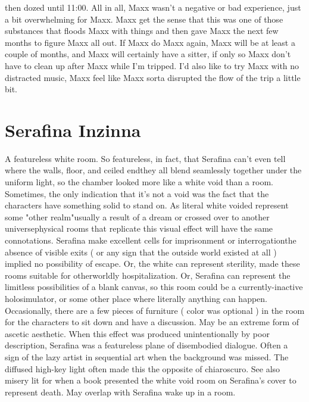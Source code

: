 \documentclass[12pt]{book}
\begin{document}
then dozed until 11:00. All in all, Maxx wasn't a negative or bad experience, just a bit overwhelming for Maxx. Maxx get the sense that this was one of those substances that floods Maxx with things and then gave Maxx the next few months to figure Maxx all out. If Maxx do Maxx again, Maxx will be at least a couple of months, and Maxx will certainly have a sitter, if only so Maxx don't have to clean up after Maxx while I'm tripped. I'd also like to try Maxx with no distracted music, Maxx feel like Maxx sorta disrupted the flow of the trip a little bit.



\chapter{Serafina Inzinna}

A featureless white room. So featureless, in fact, that Serafina can't even tell where the walls, floor, and ceiled endthey all blend seamlessly together under the uniform light, so the chamber looked more like a white void than a room. Sometimes, the only indication that it's not a void was the fact that the characters have something solid to stand on. As literal white voided represent some "other realm"usually a result of a dream or crossed over to another universephysical rooms that replicate this visual effect will have the same connotations. Serafina make excellent cells for imprisonment or interrogationthe absence of visible exits ( or any sign that the outside world existed at all ) implied no possibility of escape. Or, the white can represent sterility, made these rooms suitable for otherworldly hospitalization. Or, Serafina can represent the limitless possibilities of a blank canvas, so this room could be a currently-inactive holosimulator, or some other place where literally anything can happen. Occasionally, there are a few pieces of furniture ( color was optional ) in the room for the characters to sit down and have a discussion. May be an extreme form of ascetic aesthetic. When this effect was produced unintentionally by poor description, Serafina was a featureless plane of disembodied dialogue. Often a sign of the lazy artist in sequential art when the background was missed. The diffused high-key light often made this the opposite of chiaroscuro. See also misery lit for when a book presented the white void room on Serafina's cover to represent death. May overlap with Serafina wake up in a room.
\end{document}

